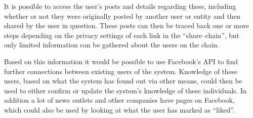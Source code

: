 It is possible to access the user's posts and details regarding these, including whether or not they were originally
posted by another user or entity and then shared by the user in question.
These posts can then be traced back one or more steps depending on the privacy settings of each link in the
``share--chain'', but only limited information can be gathered about the users on the chain.\nl

Based on this information it would be possible to use Facebook's API to find further connections between existing users
of the system.
Knowledge of these users, based on what the system has found out via other means, could then be used to either confirm
or update the system's knowledge of these individuals.
In addition a lot of news outlets and other companies have pages on Facebook, which could also be used by looking at
what the user has marked as ``liked''.
